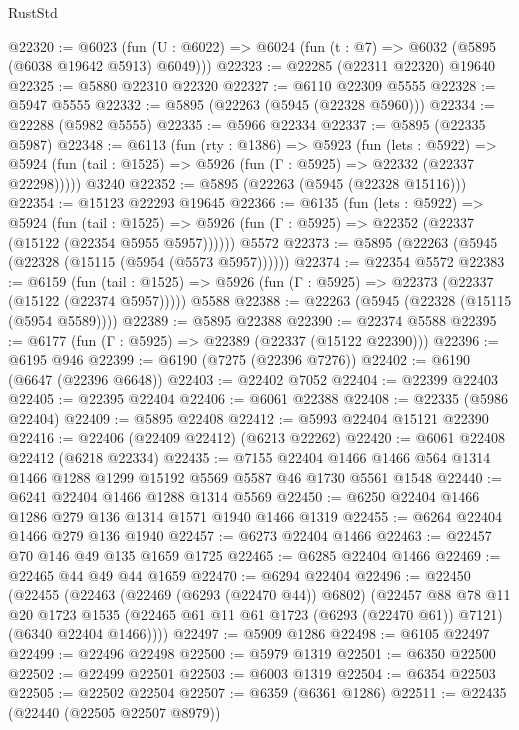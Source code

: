 \begin{lexlean}{RustStd}
\begin{coremodule}
{{@22320 := @6023
    (fun (U : @6022) => @6024 (fun (t : @7) => @6032 (@5895 (@6038 @19642 @5913) @6049)))
@22323 := @22285 (@22311 @22320) @19640
@22325 := @5880 @22310 @22320
@22327 := @6110 @22309 @5555
@22328 := @5947 @5555
@22332 := @5895 (@22263 (@5945 (@22328 @5960)))
@22334 := @22288 (@5982 @5555)
@22335 := @5966 @22334
@22337 := @5895 (@22335 @5987)
@22348 := @6113
    (fun (rty : @1386) =>
    @5923
      (fun (lets : @5922) =>
      @5924 (fun (tail : @1525) => @5926 (fun (Γ : @5925) => @22332 (@22337 @22298)))))
    @3240
@22352 := @5895 (@22263 (@5945 (@22328 @15116)))
@22354 := @15123 @22293 @19645
@22366 := @6135
    (fun (lets : @5922) =>
    @5924
      (fun (tail : @1525) =>
      @5926 (fun (Γ : @5925) => @22352 (@22337 (@15122 (@22354 @5955 @5957))))))
    @5572
@22373 := @5895 (@22263 (@5945 (@22328 (@15115 (@5954 (@5573 @5957))))))
@22374 := @22354 @5572
@22383 := @6159
    (fun (tail : @1525) => @5926 (fun (Γ : @5925) => @22373 (@22337 (@15122 (@22374 @5957)))))
    @5588
@22388 := @22263 (@5945 (@22328 (@15115 (@5954 @5589))))
@22389 := @5895 @22388
@22390 := @22374 @5588
@22395 := @6177 (fun (Γ : @5925) => @22389 (@22337 (@15122 @22390)))
@22396 := @6195 @946
@22399 := @6190 (@7275 (@22396 @7276))
@22402 := @6190 (@6647 (@22396 @6648))
@22403 := @22402 @7052
@22404 := @22399 @22403
@22405 := @22395 @22404
@22406 := @6061 @22388
@22408 := @22335 (@5986 @22404)
@22409 := @5895 @22408
@22412 := @5993 @22404 @15121 @22390
@22416 := @22406 (@22409 @22412) (@6213 @22262)
@22420 := @6061 @22408 @22412 (@6218 @22334)
@22435 := @7155
    @22404
    @1466
    @1466
    @564
    @1314
    @1466
    @1288
    @1299
    @15192
    @5569
    @5587
    @46
    @1730
    @5561
    @1548
@22440 := @6241 @22404 @1466 @1288 @1314 @5569
@22450 := @6250 @22404 @1466 @1286 @279 @136 @1314 @1571 @1940 @1466 @1319
@22455 := @6264 @22404 @1466 @279 @136 @1940
@22457 := @6273 @22404 @1466
@22463 := @22457 @70 @146 @49 @135 @1659 @1725
@22465 := @6285 @22404 @1466
@22469 := @22465 @44 @49 @44 @1659
@22470 := @6294 @22404
@22496 := @22450
    (@22455
      (@22463
        (@22469 (@6293 (@22470 @44)) @6802)
        (@22457
          @88
          @78
          @11
          @20
          @1723
          @1535
          (@22465 @61 @11 @61 @1723 (@6293 (@22470 @61)) @7121)
          (@6340 @22404 @1466))))
@22497 := @5909 @1286
@22498 := @6105 @22497
@22499 := @22496 @22498
@22500 := @5979 @1319
@22501 := @6350 @22500
@22502 := @22499 @22501
@22503 := @6003 @1319
@22504 := @6354 @22503
@22505 := @22502 @22504
@22507 := @6359 (@6361 @1286)
@22511 := @22435 (@22440 (@22505 @22507 @8979))
}}
\end{coremodule}
\end{lexlean}
